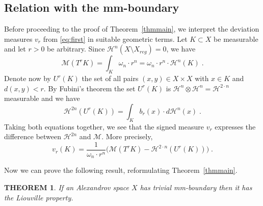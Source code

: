 \documentclass[12pt,leqno,intlimits]{amsart}
\numberwithin{equation}{section}
\newtheorem{thm}{THEOREM}[section]
\theoremstyle{definition}
\theoremstyle{remark}
\newcommand{\tref}[1]{Theorem~\ref{#1}}
\begin{document}
\subsection{Relation with the mm-boundary}
Before proceeding to the proof of  \tref{thmmain}, we interpret the deviation measures $v_r$ from \eqref{eq:first} in suitable geometric terms.
Let $K\subset X$ be    measurable   and let $r>0$ be arbitrary.
Since $\mathcal H^n (X\setminus X_{reg} )=0$, we have
$$\mathcal M (T^{r} K) =\int _K \omega _n \cdot r^n  =\omega _n \cdot r^n \cdot \mathcal H^n (K) \; .$$
Denote now by $U^r(K)$
the set of all pairs $(x,y)\in X\times X$ with $x\in K$ and $d(x,y)<r$.
By Fubini's theorem the set $U^r(K)$ is $\mathcal H^n \otimes \mathcal H^n =\mathcal H^{2\cdot n}$ measurable and we have
$$\mathcal H^{2n} (U^r (K))= \int _K b_r (x) \cdot  d\mathcal H^n (x) \;. $$
Taking both equations  together, we see that the signed measure $v_r$ expresses the difference between $\mathcal H^{2n}$ and $\mathcal M$. More precisely,
\begin{equation} \label{eq:compare}
v_r (K) = \frac 1 {\omega_n \cdot r^n} \Big(\mathcal M (T^r K)- \mathcal H^{2\cdot n} (U^r (K)) \Big)\;.
\end{equation}



Now we can prove the following result,  reformulating \tref{thmmain}.
\begin{thm} \label{reform}
If an Alexandrov space $X$ has trivial mm-boundary then  it has the Liouville property.
\end{thm}
\end{document}
